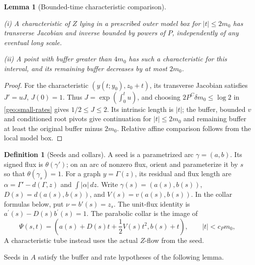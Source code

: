 \documentclass[11pt]{amsart}
\newtheorem{lemma}[theorem]{Lemma}
\theoremstyle{definition}
\newtheorem{definition}{Definition}[section]
\theoremstyle{remark}
\numberwithin{equation}{section}
\begin{document}
\begin{lemma}[Bounded-time characteristic comparison]\label{geo:local-flow}

\leavevmode\noindent\textup{(i)} A characteristic of $Z$ lying in a prescribed outer model box for $|t|\le2m_0$ has transverse Jacobian and inverse bounded by powers of $P$, independently of any eventual long scale.

\noindent\textup{(ii)} A point with buffer greater than $4m_0$ has such a characteristic for this interval, and its remaining buffer decreases by at most $2m_0$.
\end{lemma}
\begin{proof}
For the characteristic $(y(t;y_0),z_0+t)$, its transverse Jacobian satisfies $J'=uJ$, $J(0)=1$. Thus $J=\exp(\int_0^tu)$, and choosing $2P^C\delta m_0\le\log2$ in \eqref{geo:small-rates} gives $1/2\le J\le2$. Its intrinsic length is $|t|$; the buffer, bounded $v$ and conditioned root pivots give continuation for $|t|\le2m_0$ and remaining buffer at least the original buffer minus $2m_0$. Relative affine comparison follows from the local model box.
\end{proof}

\begin{definition}[Seeds and collars]\label{def:seeds-collars}
A seed is a parametrized arc $\gamma=(a,b)$. Its signed flux is $\theta(\gamma')$; on an arc of nonzero flux, orient and parameterize it by $s$ so that $\theta(\gamma_s)=1$. For a graph $y=\Gamma(z)$, its residual and flux length are $\alpha=\Gamma'-d(\Gamma,z)$ and $\int|\alpha|\,dz$. Write $\gamma(s)=(a(s),b(s))$, $D(s)=d(a(s),b(s))$, and $V(s)=v(a(s),b(s))$. In the collar formulas below, put $\nu=b'(s)=z_s$. The unit-flux identity is $a^\prime(s)-D(s)b^\prime(s)=1$. The parabolic collar is the image of
\begin{equation}\label{geo:collar-map}
\Psi(s,t)=\left(a(s)+D(s)t+\frac12V(s)t^2, b(s)+t\right),\qquad |t|<c_Pm_0,
\end{equation}
A characteristic tube instead uses the actual $Z$-flow from the seed.
\end{definition}
Seeds in $A$ satisfy the buffer and rate hypotheses of the following lemma.
\end{document}
